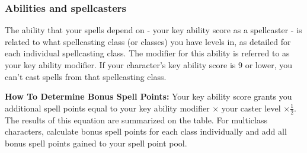 \documentclass[../VancianToPsionics.tex]{subfiles}
\begin{document}
\subsubsection{Abilities and spellcasters}
The ability that your spells depend on - your key ability score as a spellcaster - is related to what spellcasting class (or classes) you have levels in, as detailed for each individual spellcasting class. The modifier for this ability is referred to as your key ability modifier. If your character's key ability score is 9 or lower, you can't cast spells from that spellcasting class.

\textbf{How To Determine Bonus Spell Points:} 
Your key ability score grants you additional spell points equal to your key ability modifier $\times$ your caster level $\times \frac{1}{2}$. The results of this equation are summarized on the  table. For multiclass characters, calculate bonus spell points for each class individually and add all bonus spell points gained to your spell point pool.
\end{document}
